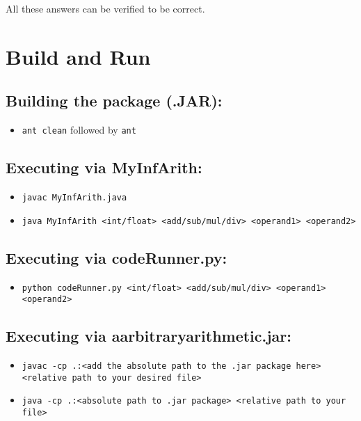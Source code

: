 \documentclass[12pt]{article}
\begin{document}
All these answers can be verified to be correct.

\section{Build and Run}

\subsection{Building the package (.JAR):}
\begin{itemize}
    \item \texttt{ant clean} followed by \texttt{ant}
\end{itemize}

\subsection{Executing via MyInfArith:}
\begin{itemize}
    \item \texttt{javac MyInfArith.java}
    \item \texttt{java MyInfArith <int/float> <add/sub/mul/div> <operand1> <operand2>}
\end{itemize}

\subsection{Executing via codeRunner.py:}
\begin{itemize}
    \item \texttt{python codeRunner.py <int/float> <add/sub/mul/div> <operand1> <operand2>}
\end{itemize}

\subsection{Executing via aarbitraryarithmetic.jar:}
\begin{itemize}
    \item \texttt{javac -cp .:<add the absolute path to the .jar package here> <relative path to your desired file>}
    \item \texttt{java -cp .:<absolute path to .jar package> <relative path to your file>}
\end{itemize}
\end{document}
